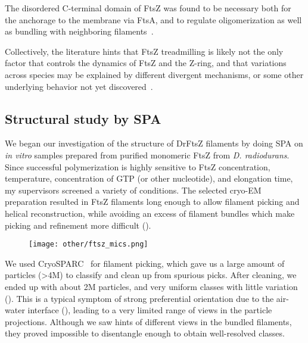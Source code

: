 The disordered C-terminal domain of FtsZ was found to be necessary both for the anchorage to the membrane via FtsA, and to regulate oligomerization as well as bundling with neighboring filaments~\cite{barrowsFtsZDynamicsBacterial2021}.

Collectively, the literature hints that FtsZ treadmilling is likely not the only factor that controls the dynamics of FtsZ and the Z-ring, and that variations across species may be explained by different divergent mechanisms, or some other underlying behavior not yet discovered~\cite{barrowsFtsZDynamicsBacterial2021}.

\subsection{Structural study by SPA}

We began our investigation of the structure of DrFtsZ filaments by doing SPA on \textit{in vitro} samples prepared from purified monomeric FtsZ from \textit{D. radiodurans}.
Since successful polymerization is highly sensitive to FtsZ concentration, temperature, concentration of GTP (or other nucleotide), and elongation time, my supervisors screened a variety of conditions.
The selected cryo-EM preparation resulted in FtsZ filaments long enough to allow filament picking and helical reconstruction, while avoiding an excess of filament bundles which make picking and refinement more difficult ().

\begin{figure}[!ht]
    \centering
    \texttt{[image: other/ftsz\_mics.png]}
    \label{fig:ftsz_micrographs}
\end{figure}

We used CryoSPARC~\cite{punjaniCryoSPARCAlgorithmsRapid2017} for filament picking, which gave us a large amount of particles (>4M) to classify and clean up from spurious picks.
After cleaning, we ended up with about 2M particles, and very uniform classes with little variation ().
This is a typical symptom of strong preferential orientation due to the air-water interface (), leading to a very limited range of views in the particle projections.
Although we saw hints of different views in the bundled filaments, they proved impossible to disentangle enough to obtain well-resolved classes.

